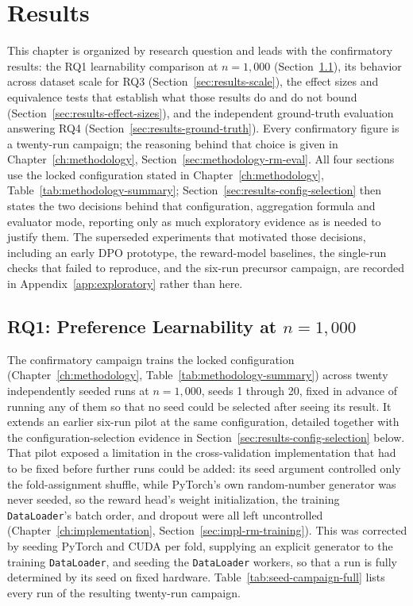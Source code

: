 \chapter{Results}
\label{ch:results}

This chapter is organized by research question and leads with the
confirmatory results: the RQ1 learnability comparison at $n=1{,}000$
(Section~\ref{sec:results-extended-campaign}), its behavior across dataset
scale for RQ3 (Section~\ref{sec:results-scale}), the effect sizes and
equivalence tests that establish what those results do and do not bound
(Section~\ref{sec:results-effect-sizes}), and the independent ground-truth
evaluation answering RQ4 (Section~\ref{sec:results-ground-truth}). Every
confirmatory figure is a twenty-run campaign; the reasoning behind that
choice is given in Chapter~\ref{ch:methodology},
Section~\ref{sec:methodology-rm-eval}. All four sections use the locked
configuration stated in Chapter~\ref{ch:methodology},
Table~\ref{tab:methodology-summary}; Section~\ref{sec:results-config-selection}
then states the two decisions behind that configuration, aggregation formula
and evaluator mode, reporting only as much exploratory evidence as is needed
to justify them. The superseded experiments that motivated those decisions,
including an early DPO prototype, the reward-model baselines, the single-run
checks that failed to reproduce, and the six-run precursor campaign, are
recorded in Appendix~\ref{app:exploratory} rather than here.

\section{RQ1: Preference Learnability at \texorpdfstring{$n=1{,}000$}{n=1,000}}
\label{sec:results-extended-campaign}

The confirmatory campaign trains the locked configuration
(Chapter~\ref{ch:methodology}, Table~\ref{tab:methodology-summary}) across
twenty independently seeded runs at $n=1{,}000$, seeds 1 through 20, fixed
in advance of running any of them so that no seed could be selected after
seeing its result. It extends an earlier six-run pilot at the same
configuration, detailed together with the configuration-selection evidence
in Section~\ref{sec:results-config-selection} below. That pilot exposed a
limitation in the cross-validation implementation that had to be fixed
before further runs could be added: its seed argument controlled only the
fold-assignment shuffle, while PyTorch's own random-number generator was
never seeded, so the reward head's weight initialization, the training
\texttt{DataLoader}'s batch order, and dropout were all left uncontrolled
(Chapter~\ref{ch:implementation}, Section~\ref{sec:impl-rm-training}). This
was corrected by seeding PyTorch and CUDA per fold, supplying an explicit
generator to the training \texttt{DataLoader}, and seeding the
\texttt{DataLoader} workers, so that a run is fully determined by its seed
on fixed hardware. Table~\ref{tab:seed-campaign-full} lists every run of
the resulting twenty-run campaign.

